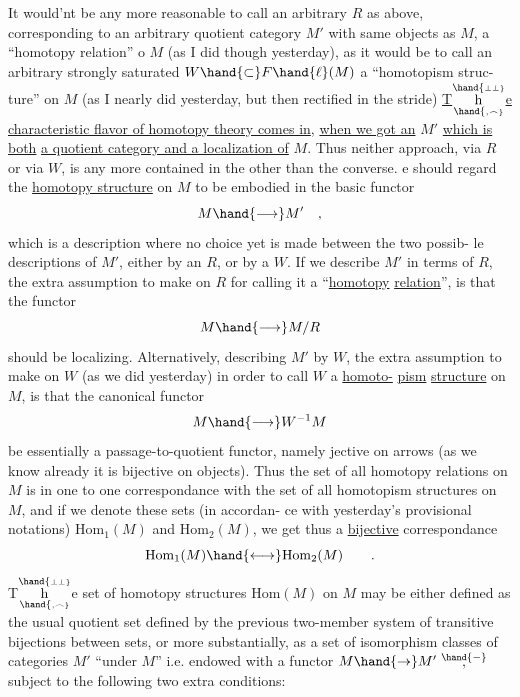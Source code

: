 It would'nt be any more reasonable to call an arbitrary $R$ as above,
corresponding to an arbitrary quotient category $M'$ with same objects as
$M$, a ``homotopy relation'' o $M$ (as I did though yesterday), as it would
be to call an arbitrary strongly saturated $W\hand{\subset}F\hand{\ell}(M)$ a ``homotopism struc-%
ture'' on $M$ (as I nearly did yesterday, but then rectified in the stride)
\uline{T$\overset{\hand{\scriptscriptstyle\perp\perp}}{\underset{\hand{\scriptscriptstyle,\frown}}{\mathrm h}}$e characteristic flavor of homotopy theory comes in}, \uline{when we got an}
$M'$ \uline{which is} \uline{both} \uline{a quotient category and a localization of} $M$. Thus 
neither approach, via $R$ or via $W$, is any more contained in the other\hand{,}
than  the converse. e should regard the \uline{homotopy structure} on $M$ to
be embodied in the basic functor
\[ M \hand{\longrightarrow} M' \quad , \]
which is a description where no choice yet is made between the two possib-%
le descriptions of $M'$, either by an $R$, or by a $W$. If we describe $M'$ in
terms of $R$, the extra assumption to make on $R$ for calling it a ``\uline{homotopy}
\uline{relation}'', is  that the  functor
\[ M \hand{\longrightarrow} M/R \]
should be localizing. Alternatively, describing $M'$ by $W$, the extra
assumption to make on $W$ (as we did yesterday) in order to call $W$ a \uline{homoto-}%
\uline{pism} \uline{structure} on $M$, is that the canonical  functor
\[ M \hand{\longrightarrow} W^{-1}M \]
be essentially a passage-to-quotient functor, namely jective on arrows
(as we know already it is bijective on objects). Thus the set of all
homotopy relations on $M$ is in one to one correspondance with the set of
all homotopism structures on $M$, and if we denote these sets (in accordan-%
ce with yesterday's provisional notations) $\mathrm{Hom}_1(M)$ and $\mathrm{Hom}_2(M)$, we get
thus a \uline{bijective} correspondance
\[ \mathrm{Hom}_1(M) \hand{\longleftrightarrow} \mathrm{Hom}_2(M) \qquad . \]
T$\overset{\hand{\scriptscriptstyle\perp\perp}}{\underset{\hand{\scriptscriptstyle,\frown}}{\mathrm h}}$e set of homotopy structures $\mathrm{Hom}(M)$ on $M$ may be either defined as the
usual quotient set defined by the previous two-member system of transitive
bijections between sets, or more substantially, as a set of isomorphism
classes of categories $M'$ ``under $M$'' i.e. endowed with a functor $M\hand{\to} M'$\,$\overset{\hand{-}}{,}$
 subject to the following two extra conditions:

